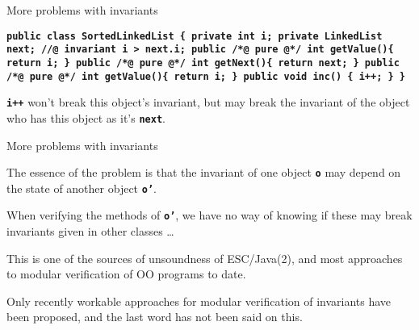 \documentclass[
pdf,
nocolorBG,
slideColor,
erik,
]{prosper}
\newcommand{\code}[1]{{\rm \texttt{\textbf{\small #1}}}}
\begin{document}
\begin{slide}{More problems with invariants}
\vspace*{-3ex}


\begin{alltt}\code{\scriptsize public class SortedLinkedList \{
   private int i;
   private LinkedList next;
   //@ invariant i > next.i;
   public /*@ pure @*/ int getValue()\{ return i; \}
   public /*@ pure @*/ int getNext()\{ return next; \}
   public /*@ pure @*/ int getValue()\{ return i; \}
   public void inc() \{ i++; \}
  \}}
\end{alltt}

\code{i++} won't break this object's invariant, but may break the invariant
of the object who has this object as it's \code{next}.

\end{slide}


\begin{slide}{More problems with invariants}
\vspace*{-3ex}

The essence of the problem is that the invariant of
one object \code{o} may depend on the state of another object \code{o'}.

\medskip

When verifying the methods of \code{o'}, we have no way of knowing 
if these may break invariants given in other classes \ldots

\medskip

This is one of the sources of unsoundness of ESC/Java(2),
and most approaches to modular verification of OO programs to date.

\medskip

Only recently workable approaches for modular verification of invariants 
have been proposed, and the last word has not been said on this.

\end{slide}
\end{document}
